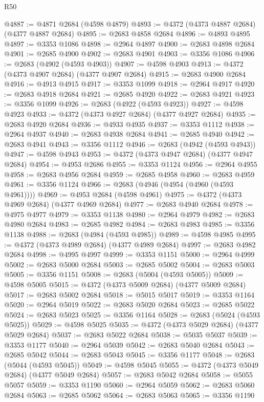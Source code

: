 \begin{lexlean}{R50}
\begin{coremodule}
@4887 := @4871 @2684 (@4598 @4879)
@4893 := @4372 (@4373 @4887 @2684) (@4377 @4887 @2684)
@4895 := @2683 @4858 @2684
@4896 := @4893 @4895
@4897 := @3353 @1086
@4898 := @2964 @4897
@4900 := @2683 @4898 @2684
@4901 := @2685 @4900
@4902 := @2683 @4901
@4903 := @3356 @1086
@4906 := @2683 (@4902 (@4593 @4903))
@4907 := @4598 @4903
@4913 := @4372 (@4373 @4907 @2684) (@4377 @4907 @2684)
@4915 := @2683 @4900 @2684
@4916 := @4913 @4915
@4917 := @3353 @1099
@4918 := @2964 @4917
@4920 := @2683 @4918 @2684
@4921 := @2685 @4920
@4922 := @2683 @4921
@4923 := @3356 @1099
@4926 := @2683 (@4922 (@4593 @4923))
@4927 := @4598 @4923
@4933 := @4372 (@4373 @4927 @2684) (@4377 @4927 @2684)
@4935 := @2683 @4920 @2684
@4936 := @4933 @4935
@4937 := @3353 @1112
@4938 := @2964 @4937
@4940 := @2683 @4938 @2684
@4941 := @2685 @4940
@4942 := @2683 @4941
@4943 := @3356 @1112
@4946 := @2683 (@4942 (@4593 @4943))
@4947 := @4598 @4943
@4953 := @4372 (@4373 @4947 @2684) (@4377 @4947 @2684)
@4954 := @4953 @2686
@4955 := @3353 @1124
@4956 := @2964 @4955
@4958 := @2683 @4956 @2684
@4959 := @2685 @4958
@4960 := @2683 @4959
@4961 := @3356 @1124
@4966 := @2683 (@4946 (@4954 (@4960 (@4593 @4961))))
@4969 := @4953 @2684 (@4598 @4961)
@4975 := @4372 (@4373 @4969 @2684) (@4377 @4969 @2684)
@4977 := @2683 @4940 @2684
@4978 := @4975 @4977
@4979 := @3353 @1138
@4980 := @2964 @4979
@4982 := @2683 @4980 @2684
@4983 := @2685 @4982
@4984 := @2683 @4983
@4985 := @3356 @1138
@4988 := @2683 (@4984 (@4593 @4985))
@4989 := @4598 @4985
@4995 := @4372 (@4373 @4989 @2684) (@4377 @4989 @2684)
@4997 := @2683 @4982 @2684
@4998 := @4995 @4997
@4999 := @3353 @1151
@5000 := @2964 @4999
@5002 := @2683 @5000 @2684
@5003 := @2685 @5002
@5004 := @2683 @5003
@5005 := @3356 @1151
@5008 := @2683 (@5004 (@4593 @5005))
@5009 := @4598 @5005
@5015 := @4372 (@4373 @5009 @2684) (@4377 @5009 @2684)
@5017 := @2683 @5002 @2684
@5018 := @5015 @5017
@5019 := @3353 @1164
@5020 := @2964 @5019
@5022 := @2683 @5020 @2684
@5023 := @2685 @5022
@5024 := @2683 @5023
@5025 := @3356 @1164
@5028 := @2683 (@5024 (@4593 @5025))
@5029 := @4598 @5025
@5035 := @4372 (@4373 @5029 @2684) (@4377 @5029 @2684)
@5037 := @2683 @5022 @2684
@5038 := @5035 @5037
@5039 := @3353 @1177
@5040 := @2964 @5039
@5042 := @2683 @5040 @2684
@5043 := @2685 @5042
@5044 := @2683 @5043
@5045 := @3356 @1177
@5048 := @2683 (@5044 (@4593 @5045))
@5049 := @4598 @5045
@5055 := @4372 (@4373 @5049 @2684) (@4377 @5049 @2684)
@5057 := @2683 @5042 @2684
@5058 := @5055 @5057
@5059 := @3353 @1190
@5060 := @2964 @5059
@5062 := @2683 @5060 @2684
@5063 := @2685 @5062
@5064 := @2683 @5063
@5065 := @3356 @1190

\end{coremodule}
\end{lexlean}
